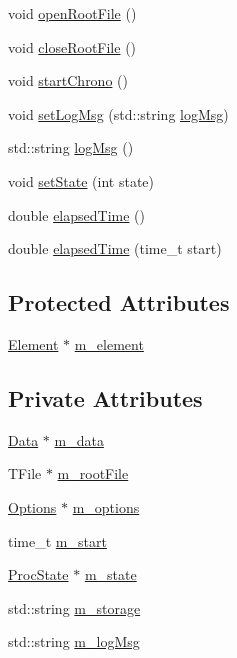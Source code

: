 \begin{DoxyCompactItemize}
\item 
void \hyperlink{classProcessus_aacf6812880c1d1a2bf14a4a39458f443}{open\+Root\+File} ()
\item 
void \hyperlink{classProcessus_a2f3c41e99da4c738ea3d8f7b0d20a665}{close\+Root\+File} ()
\item 
void \hyperlink{classProcessus_a5e4d34b86241fa0756e07375a14ff4b2}{start\+Chrono} ()
\item 
void \hyperlink{classProcessus_a471833f89047aa9a7ff6200a31c17a1d}{set\+Log\+Msg} (std\+::string \hyperlink{classProcessus_a42fdeb17dc13ba854222666b6aa29b61}{log\+Msg})
\item 
std\+::string \hyperlink{classProcessus_a42fdeb17dc13ba854222666b6aa29b61}{log\+Msg} ()
\item 
void \hyperlink{classProcessus_ad38cde0f1bcefa00b068e7947b8af927}{set\+State} (int state)
\item 
double \hyperlink{classProcessus_aecca96218c65bc805c988cd95447df55}{elapsed\+Time} ()
\item 
double \hyperlink{classProcessus_a06d3815ad56593dfd0d3c1f534f8b146}{elapsed\+Time} (time\+\_\+t start)
\end{DoxyCompactItemize}
\subsection*{Protected Attributes}
\begin{DoxyCompactItemize}
\item 
\hyperlink{classElement}{Element} $\ast$ \hyperlink{classProcessus_aa9d24d53c3e52f36786cabb5d8e296e7}{m\+\_\+element}
\end{DoxyCompactItemize}
\subsection*{Private Attributes}
\begin{DoxyCompactItemize}
\item 
\hyperlink{classData}{Data} $\ast$ \hyperlink{classProcessus_a3da9a9de8af54e2f47807a3e09dfccff}{m\+\_\+data}
\item 
T\+File $\ast$ \hyperlink{classProcessus_a76114f8cf2111e910c323a7ae05a015d}{m\+\_\+root\+File}
\item 
\hyperlink{classOptions}{Options} $\ast$ \hyperlink{classProcessus_a74205f3c1e00c4448f7b3257c2351797}{m\+\_\+options}
\item 
time\+\_\+t \hyperlink{classProcessus_a8ec00b2e12c5beada932610f30218e93}{m\+\_\+start}
\item 
\hyperlink{structProcState}{Proc\+State} $\ast$ \hyperlink{classProcessus_ab3539eee42891ceae0baf4395ae7fb61}{m\+\_\+state}
\item 
std\+::string \hyperlink{classProcessus_a132b1e71f72327e5a87f0a168c7b6325}{m\+\_\+storage}
\item 
std\+::string \hyperlink{classProcessus_a3bc0140a3a69a83951ab7f9986bd2c84}{m\+\_\+log\+Msg}
\end{DoxyCompactItemize}


